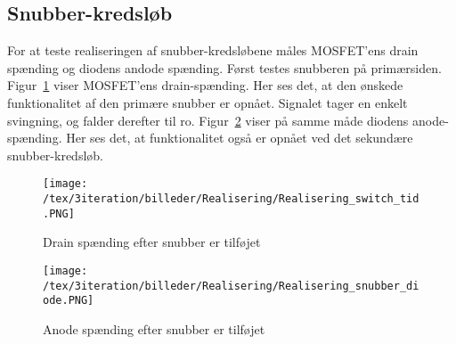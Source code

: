 
\subsection{Snubber-kredsløb}
For at teste realiseringen af snubber-kredsløbene måles MOSFET'ens drain spænding og diodens andode spænding. Først testes snubberen på primærsiden. Figur~\ref{fig:realiseirng_snubber_MOSFET_3} viser MOSFET'ens drain-spænding. Her ses det, at den ønskede funktionalitet af den primære snubber er opnået. Signalet tager en enkelt svingning, og falder derefter til ro. Figur~\ref{fig:realiseirng_snubber_diode_3} viser på samme måde diodens anode-spænding. Her ses det, at funktionalitet også er opnået ved det sekundære snubber-kredsløb. 

\begin{figure}[H]
	\center
	\texttt{[image: /tex/3iteration/billeder/Realisering/Realisering\_switch\_tid.PNG]}
	\caption{Drain spænding efter snubber er tilføjet}
	\label{fig:realiseirng_snubber_MOSFET_3}
\end{figure} 

\begin{figure}[H]
	\center
	\texttt{[image: /tex/3iteration/billeder/Realisering/Realisering\_snubber\_diode.PNG]}
	\caption{Anode spænding efter snubber er tilføjet}
	\label{fig:realiseirng_snubber_diode_3}
\end{figure} 

